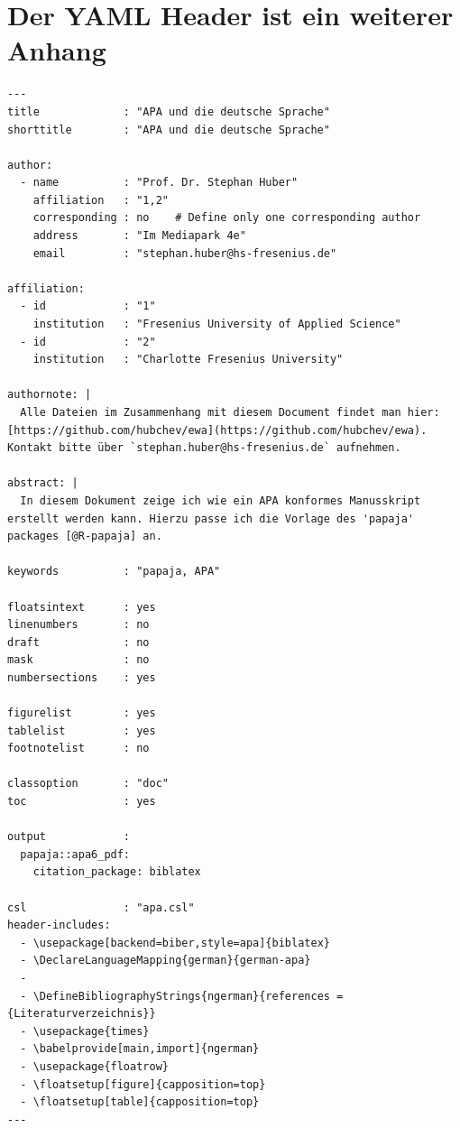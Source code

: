 \documentclass[
  doc,floatsintext]{apa6}
\begin{document}
\newpage

\hypertarget{der-yaml-header-ist-ein-weiterer-anhang}{%
\section{Der YAML Header ist ein weiterer Anhang}\label{der-yaml-header-ist-ein-weiterer-anhang}}

\begin{verbatim}
---
title             : "APA und die deutsche Sprache"
shorttitle        : "APA und die deutsche Sprache"

author: 
  - name          : "Prof. Dr. Stephan Huber"
    affiliation   : "1,2"
    corresponding : no    # Define only one corresponding author
    address       : "Im Mediapark 4e"
    email         : "stephan.huber@hs-fresenius.de"

affiliation:
  - id            : "1"
    institution   : "Fresenius University of Applied Science"
  - id            : "2"
    institution   : "Charlotte Fresenius University"

authornote: |
  Alle Dateien im Zusammenhang mit diesem Document findet man hier: [https://github.com/hubchev/ewa](https://github.com/hubchev/ewa). Kontakt bitte über `stephan.huber@hs-fresenius.de` aufnehmen.

abstract: |
  In diesem Dokument zeige ich wie ein APA konformes Manusskript erstellt werden kann. Hierzu passe ich die Vorlage des 'papaja' packages [@R-papaja] an.

keywords          : "papaja, APA"

floatsintext      : yes
linenumbers       : no
draft             : no
mask              : no
numbersections    : yes

figurelist        : yes
tablelist         : yes
footnotelist      : no

classoption       : "doc"
toc               : yes

output            : 
  papaja::apa6_pdf:
    citation_package: biblatex

csl               : "apa.csl"
header-includes:
  - \usepackage[backend=biber,style=apa]{biblatex} 
  - \DeclareLanguageMapping{german}{german-apa}
  - 
  - \DefineBibliographyStrings{ngerman}{references = {Literaturverzeichnis}}
  - \usepackage{times}
  - \babelprovide[main,import]{ngerman}
  - \usepackage{floatrow}
  - \floatsetup[figure]{capposition=top}
  - \floatsetup[table]{capposition=top}
---
\end{verbatim}


\printbibliography
\end{document}
